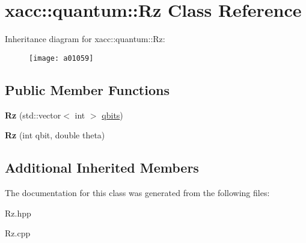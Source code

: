 \hypertarget{a01059}{}\section{xacc\+:\+:quantum\+:\+:Rz Class Reference}
\label{a01059}
Inheritance diagram for xacc\+:\+:quantum\+:\+:Rz\+:\begin{figure}[H]
\begin{center}
\leavevmode
\texttt{[image: a01059]}
\end{center}
\end{figure}
\subsection*{Public Member Functions}
\begin{DoxyCompactItemize}
\item 
\mbox{\label{a01059_a7ce912c7f9c9e8f4e7e60f9dba95538b}} 
{\bfseries Rz} (std\+::vector$<$ int $>$ \hyperlink{a01015_a2a56be6c2519ea65df4d06f4abae1393}{qbits})
\item 
\mbox{\label{a01059_ae30eaf75feb8f896c22043629d21b834}} 
{\bfseries Rz} (int qbit, double theta)
\end{DoxyCompactItemize}
\subsection*{Additional Inherited Members}


The documentation for this class was generated from the following files\+:\begin{DoxyCompactItemize}
\item 
Rz.\+hpp\item 
Rz.\+cpp\end{DoxyCompactItemize}
